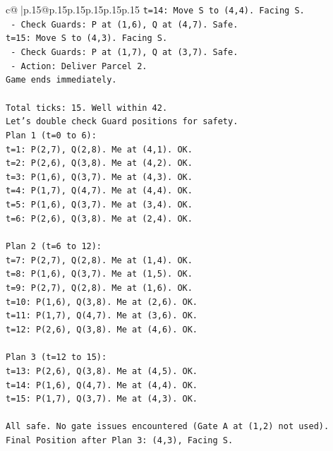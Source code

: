 \documentclass{article}
\begin{document}
{\begin{supertabular}{c@{$\;$}|p{.15\linewidth}@{}p{.15\linewidth}p{.15\linewidth}p{.15\linewidth}p{.15\linewidth}p{.15\linewidth}}
{{{\texttt{t=14: Move S to (4,4). Facing S.} \\
\texttt{   {-} Check Guards: P at (1,6), Q at (4,7). Safe.} \\
\texttt{t=15: Move S to (4,3). Facing S.} \\
\texttt{   {-} Check Guards: P at (1,7), Q at (3,7). Safe.} \\
\texttt{   {-} Action: Deliver Parcel 2.} \\
\texttt{Game ends immediately.} \\
\\ 
\texttt{Total ticks: 15. Well within 42.} \\
\texttt{Let's double check Guard positions for safety.} \\
\texttt{Plan 1 (t=0 to 6):} \\
\texttt{t=1: P(2,7), Q(2,8). Me at (4,1). OK.} \\
\texttt{t=2: P(2,6), Q(3,8). Me at (4,2). OK.} \\
\texttt{t=3: P(1,6), Q(3,7). Me at (4,3). OK.} \\
\texttt{t=4: P(1,7), Q(4,7). Me at (4,4). OK.} \\
\texttt{t=5: P(1,6), Q(3,7). Me at (3,4). OK.} \\
\texttt{t=6: P(2,6), Q(3,8). Me at (2,4). OK.} \\
\\ 
\texttt{Plan 2 (t=6 to 12):} \\
\texttt{t=7: P(2,7), Q(2,8). Me at (1,4). OK.} \\
\texttt{t=8: P(1,6), Q(3,7). Me at (1,5). OK.} \\
\texttt{t=9: P(2,7), Q(2,8). Me at (1,6). OK.} \\
\texttt{t=10: P(1,6), Q(3,8). Me at (2,6). OK.} \\
\texttt{t=11: P(1,7), Q(4,7). Me at (3,6). OK.} \\
\texttt{t=12: P(2,6), Q(3,8). Me at (4,6). OK.} \\
\\ 
\texttt{Plan 3 (t=12 to 15):} \\
\texttt{t=13: P(2,6), Q(3,8). Me at (4,5). OK.} \\
\texttt{t=14: P(1,6), Q(4,7). Me at (4,4). OK.} \\
\texttt{t=15: P(1,7), Q(3,7). Me at (4,3). OK.} \\
\\ 
\texttt{All safe. No gate issues encountered (Gate A at (1,2) not used).} \\
\texttt{Final Position after Plan 3: (4,3), Facing S.} \\
}}}
\end{supertabular}}
\end{document}
